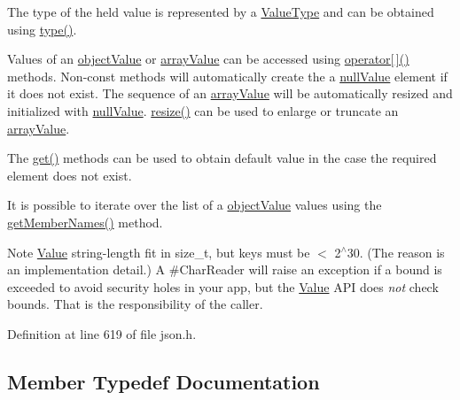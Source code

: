 The type of the held value is represented by a \hyperlink{namespace_json_a7d654b75c16a57007925868e38212b4e}{Value\+Type} and can be obtained using \hyperlink{class_json_1_1_value_a8ce61157a011894f0252ceed232312de}{type()}.

Values of an \hyperlink{namespace_json_a7d654b75c16a57007925868e38212b4eae8386dcfc36d1ae897745f7b4f77a1f6}{object\+Value} or \hyperlink{namespace_json_a7d654b75c16a57007925868e38212b4eadc8f264f36b55b063c78126b335415f4}{array\+Value} can be accessed using \hyperlink{class_json_1_1_value_a7d99f5dba388cdaa152ce6ef933d64ef}{operator\mbox{[}$\,$\mbox{]}()} methods. Non-\/const methods will automatically create the a \hyperlink{namespace_json_a7d654b75c16a57007925868e38212b4ea7d9899633b4409bd3fc107e6737f8391}{null\+Value} element if it does not exist. The sequence of an \hyperlink{namespace_json_a7d654b75c16a57007925868e38212b4eadc8f264f36b55b063c78126b335415f4}{array\+Value} will be automatically resized and initialized with \hyperlink{namespace_json_a7d654b75c16a57007925868e38212b4ea7d9899633b4409bd3fc107e6737f8391}{null\+Value}. \hyperlink{class_json_1_1_value_aa284353271ada427dbfa04a42f2be407}{resize()} can be used to enlarge or truncate an \hyperlink{namespace_json_a7d654b75c16a57007925868e38212b4eadc8f264f36b55b063c78126b335415f4}{array\+Value}.

The \hyperlink{class_json_1_1_value_a034eb7bf85a44fa759bdaa232788ca66}{get()} methods can be used to obtain default value in the case the required element does not exist.

It is possible to iterate over the list of a \hyperlink{namespace_json_a7d654b75c16a57007925868e38212b4eae8386dcfc36d1ae897745f7b4f77a1f6}{object\+Value} values using the \hyperlink{class_json_1_1_value_a79d7725dce6260317333e69022367ac9}{get\+Member\+Names()} method.

\begin{DoxyNote}{Note}
\hyperlink{class_json_1_1_value_ada6ba1369448fb0240bccc36efaa46f7}{Value} string-\/length fit in size\+\_\+t, but keys must be $<$ 2$^\wedge$30. (The reason is an implementation detail.) A \#\+Char\+Reader will raise an exception if a bound is exceeded to avoid security holes in your app, but the \hyperlink{class_json_1_1_value}{Value} A\+PI does {\itshape not} check bounds. That is the responsibility of the caller. 
\end{DoxyNote}


Definition at line 619 of file json.\+h.



\subsection{Member Typedef Documentation}
\mbox{\label{class_json_1_1_value_a184a91566cccca7b819240f0d5561c7d}} 
